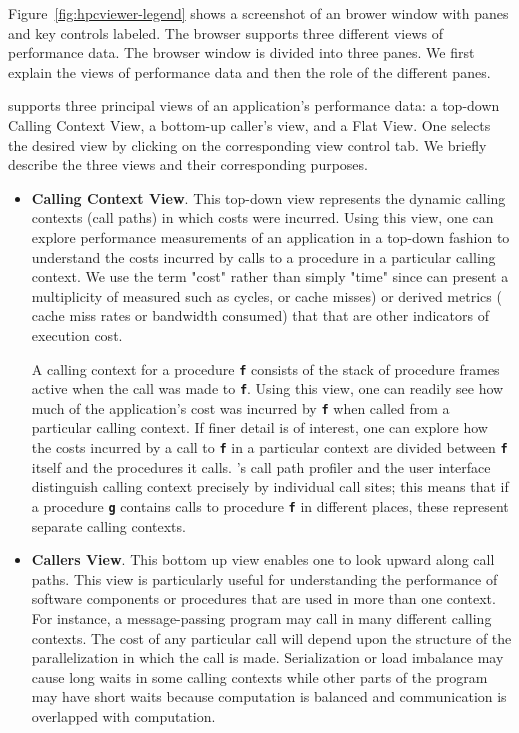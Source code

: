 Figure~\ref{fig:hpcviewer-legend} shows a screenshot of an \hpcviewer{} brower window with panes and key controls labeled.
The browser supports three different views of performance data.
The browser window is divided into three panes.
We first explain the views of performance data and then the role of the different panes.


\hpcviewer{} supports three principal views of an application's performance data: a top-down Calling Context View, a bottom-up caller's view, and a Flat View.
One selects the desired view by clicking on the corresponding view control tab.
We briefly describe the three views and their corresponding purposes.

\begin{itemize}
\item \textbf{Calling Context View}.
  This top-down view represents the dynamic calling contexts (call paths) in which costs were incurred.
  Using this view, one can explore performance measurements of an application in a top-down fashion to understand the costs incurred by calls to a procedure in a particular calling context.
  We use the term "cost" rather than simply "time" since \hpcviewer{} can present a multiplicity of measured such as cycles, or cache misses) or derived metrics (\eg{} cache miss rates or bandwidth consumed) that that are other indicators of execution cost.

  A calling context for a procedure \textbf{\texttt{f}} consists of the stack of procedure frames active when the call was made to \textbf{\texttt{f}}.
  Using this view, one can readily see how much of the application's cost was incurred by \textbf{\texttt{f}} when called from a particular calling context.
  If finer detail is of interest, one can explore how the costs incurred by a call to \textbf{\texttt{f}} in a particular context are divided between \textbf{\texttt{f}} itself and the procedures it calls.
  \HPCToolkit{}'s call path profiler \hpcrun{} and the \hpcviewer{} user interface distinguish calling context precisely by individual call sites; this means that if a procedure \textbf{\texttt{g}} contains calls to procedure \textbf{\texttt{f}} in different places, these represent separate calling contexts.

\item \textbf{Callers View}. This bottom up view enables one to look upward along call paths. This view is particularly useful for understanding the performance of software components or procedures that are used in more than one context. For instance, a message-passing program may call  in many different calling contexts. The cost of any particular call will depend upon the structure of the parallelization in which the call is made. Serialization or load imbalance may cause long waits in some calling contexts while other parts of the program may have short waits because computation is balanced and communication is overlapped with computation.


\end{itemize}
